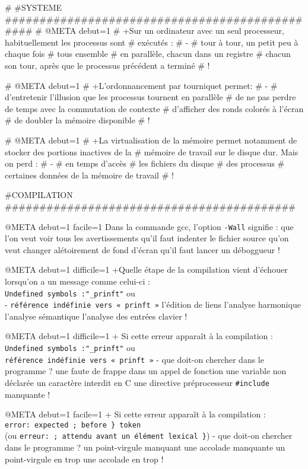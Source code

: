 # #SYSTEME ###############################################
# @META debut=1
# +Sur un ordinateur avec un seul processeur, habituellement les processus sont
# exécutés :
# -
#  tour à tour, un petit peu à chaque fois
#  tous ensemble
#  en parallèle, chacun dans un registre
#  chacun son tour, après que le processus précédent a terminé
# !

# @META debut=1
# +L'ordonnancement par tourniquet permet:
# -
#  d'entretenir l'illusion que les processus tournent en parallèle
#  de ne pas perdre de temps avec la commutation de contexte
#  d'afficher des ronds colorés à l'écran
#  de doubler la mémoire disponible
# !

# @META debut=1
# +La virtualisation de la mémoire permet notamment de stocker des portions inactives de la
# mémoire de travail sur le disque dur. Mais on perd :
# -
#  en temps d'accès
#  les fichiers du disque
#  des processus
#  certaines données de la mémoire de travail
# !


#COMPILATION ##########################################

@META debut=1 facile=1
Dans la commande gcc, l'option \verb|-Wall| signifie :
 que l'on veut voir tous les avertissements
 qu'il faut indenter le fichier source
 qu'on veut changer alétoirement de fond d'écran
 qu'il faut lancer un déboggueur
!

@META debut=1 difficile=1
+Quelle étape de la compilation vient d'échouer lorsqu'on a un message
 comme celui-ci : \\
 \verb+Undefined symbols :"_prinft"+ ou \\
- \verb+référence indéfinie vers « prinft »+
 l'édition de liens
 l'analyse harmonique
 l'analyse sémantique
 l'analyse des entrées clavier
!

@META debut=1 difficile=1
+ Si cette erreur apparaît à la compilation : \\
 \verb+Undefined symbols :"_prinft"+ ou \\
 \verb+référence indéfinie vers « prinft »+
- que doit-on chercher dans le programme ?
  une faute de frappe dans un appel de fonction
  une variable non déclarée
  un caractère interdit en C
  une directive préprocesseur \verb+#include+ manquante
!

@META debut=1 facile=1
+ Si cette erreur apparaît à la compilation : \\
 \verb+error: expected ; before } token+ \\
(ou \verb+erreur: ; attendu avant un élément lexical }+)
- que doit-on chercher dans le programme ?
 un point-virgule manquant
 une accolade manquante
 un point-virgule en trop
 une accolade en trop
!


